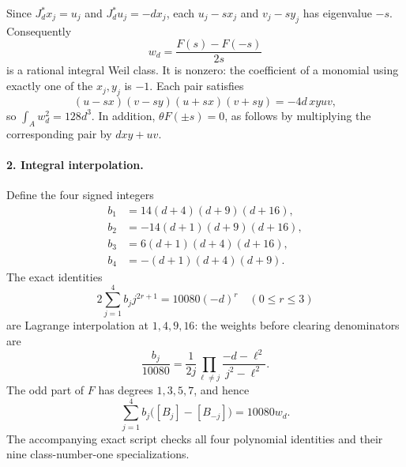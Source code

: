 Since $J_d^*x_j=u_j$ and $J_d^*u_j=-dx_j$, each
$u_j-sx_j$ and $v_j-sy_j$ has eigenvalue $-s$. Consequently
\[
 w_d=\frac{F(s)-F(-s)}{2s}
\]
is a rational integral Weil class. It is nonzero: the coefficient
of a monomial using exactly one of the $x_j,y_j$ is $-1$.
Each pair satisfies
\[
 (u-sx)(v-sy)(u+sx)(v+sy)=-4d\,xyuv,
\]
so $\int_A w_d^2=128d^3$. In addition, $\theta F(\pm s)=0$,
as follows by multiplying the corresponding pair by $dxy+uv$.

\paragraph{2. Integral interpolation.}
Define the four signed integers
\begin{align*}
 b_1&=14(d+4)(d+9)(d+16),\\
 b_2&=-14(d+1)(d+9)(d+16),\\
 b_3&=6(d+1)(d+4)(d+16),\\
 b_4&=-(d+1)(d+4)(d+9).
\end{align*}
The exact identities
\[
 2\sum_{j=1}^4 b_jj^{2r+1}=10080(-d)^r
 \quad(0\le r\le3)
\]
are Lagrange interpolation at $1,4,9,16$: the weights before
clearing denominators are
\[
 \frac{b_j}{10080}
 =\frac1{2j}\prod_{\ell\ne j}
       \frac{-d-\ell^2}{j^2-\ell^2}.
\]
The odd part of $F$ has degrees $1,3,5,7$, and hence
\[
 \sum_{j=1}^4b_j\bigl([B_j]-[B_{-j}]\bigr)=10080w_d.
\]
The accompanying exact script checks all four polynomial identities
and their nine class-number-one specializations.

